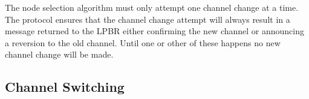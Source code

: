 The node selection algorithm must only attempt one channel change at a time. The protocol ensures that the
channel change attempt will always result in a message returned to the LPBR either confirming the new channel
or announcing a reversion to the old channel. Until one or other of these happens no new channel change will
be made.







\subsection{Channel Switching}
\label{sec:channelswitch}


